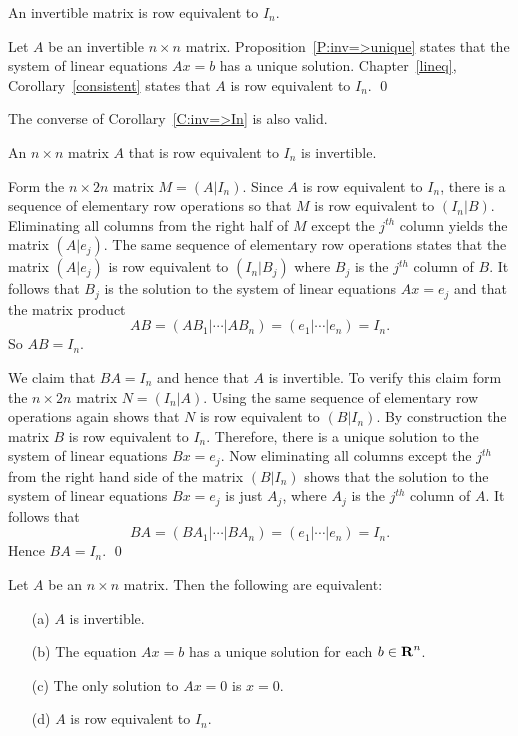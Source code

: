 \begin{cor} \label{C:inv=>In}
An invertible matrix is row equivalent to $I_n$.
\end{cor}

\proof  Let $A$ be an invertible $n\times n$ matrix.
Proposition~\ref{P:inv=>unique} states that the system of linear equations
$Ax=b$ has a unique solution.  Chapter~\ref{lineq}, Corollary~\ref{consistent}
states that $A$ is row equivalent to $I_n$.  \qed

The converse of Corollary~\ref{C:inv=>In} is also valid.

\begin{prop}  \label{P:row=>inv}
An $n\times n$ matrix $A$ that is row equivalent to $I_n$ is invertible.
\end{prop}

\proof  Form the $n\times 2n$ matrix $M=(A|I_n)$.  Since $A$ is row equivalent
to $I_n$, there is a sequence of elementary row operations so that $M$ is
row equivalent to $(I_n|B)$.  Eliminating all columns from the right half
of $M$ except the $j^{th}$ column yields the matrix $(A|e_j)$.  The same
sequence of elementary row operations states that the matrix $(A|e_j)$ is
row equivalent to $(I_n|B_j)$ where $B_j$ is the $j^{th}$ column of $B$.  It
follows that $B_j$ is the solution to the system of linear equations
$Ax=e_j$ and that the matrix product
\[
AB = (AB_1|\cdots|AB_n) = (e_1|\cdots|e_n) = I_n.
\]
So $AB=I_n$.

We claim that $BA=I_n$ and hence that $A$ is invertible.  To verify this claim
form the $n\times 2n$ matrix $N=(I_n|A)$.  Using the same sequence of
elementary row operations again shows that $N$ is row equivalent to $(B|I_n)$.
By construction
the matrix $B$ is row equivalent to $I_n$.  Therefore, there is a unique
solution to the system of linear equations $Bx=e_j$.  Now eliminating all
columns except the $j^{th}$ from the right hand side of the matrix $(B|I_n)$
shows that the solution to the system of linear equations $Bx=e_j$ is just
$A_j$, where $A_j$ is the $j^{th}$ column of $A$.  It follows that
\[
BA = (BA_1|\cdots|BA_n) = (e_1|\cdots|e_n) = I_n.
\]
Hence $BA=I_n$.  \qed

\begin{thm} \label{invertequiv}
Let $A$ be an $n\times n$ matrix.  Then the following are
equivalent:
\begin{itemize}
\item[(a)]  $A$ is invertible. 
\item[(b)] The equation $Ax=b$ has a unique solution for each
$b\in\mbox{$\bf{R}$}^n$.
\item[(c)]  The only solution to $Ax=0$ is $x=0$.
\item[(d)]  $A$ is row equivalent to $I_n$.
\end{itemize}
\end{thm}

